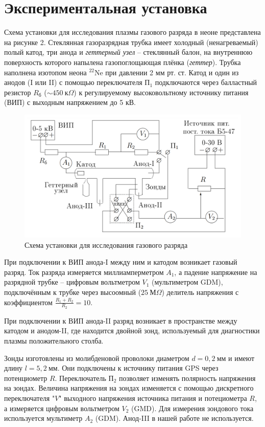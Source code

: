 \documentclass[a4paper,12pt]{article}
\begin{document}
\section*{Экспериментальная установка}

Схема установки для исследования плазмы газового разряда в неоне представлена на рисунке 2. Стеклянная газоразрядная трубка имеет холодный (ненагреваемый) полый катод, три анода и \textit{геттерный узел} -- стеклянный балон, на внутреннюю поверхность которого напылена газопоглощающая плёнка (\textit{геттер}). Трубка наполнена изотопом неона ${}^{22}\text{Ne}$ при давлении 2 мм рт. ст. Катод и один из анодов (I или II) с помощью переключателя $\text{П}_1$ подключаются через балластный резистор $R_{\text{б}}$ ($\sim450~\text{к}\Omega$) к регулируемому высоковольтному источнику питания (ВИП) с выходным напряжением до 5 кВ.

\begin{figure}[h]
	\centering
	\includegraphics[scale=0.30]{Device}
	\caption{Схема установки для исследования газового разряда} \label{Device}
\end{figure}

При подключении к ВИП анода-I между ним и катодом возникает газовый разряд. Ток разряда измеряется миллиамперметром $A_1$, а падение напряжение на разрядной трубке -- цифровым вольтметром $V_1$ (мультиметром GDM), подключённым к трубке через высоомный ($25~\text{М}\Omega$) делитель напряжения с коэффициентом $\frac{R_1+R_2}{R_2}=10$.

При подключении к ВИП анода-II разряд возникает в пространстве между катодом и анодом-II, где находится двойной зонд, используемый для диагностики плазмы положительного столба.

Зонды изготовлены из молибденовой проволоки диаметром $d=0,2~\text{мм}$ и имеют длину $l=5,2~\text{мм}$. Они подключены к источнику питания GPS через потенциометр $R$. Переключатель $\text{П}_2$ позволяет изменять полярность напряжения на зондах. Величина напряжения на зондах изменяется с помощью дискретного переключателя "$V$" выходного напряжения источника питания и потециометра $R$, а измеряется цифровым вольтметром $V_2$ (GMD). Для измерения зондового тока используется мультиметр $A_2$ (GDM). Анод-III в нашей работе не используется.
\newpage
\end{document}
